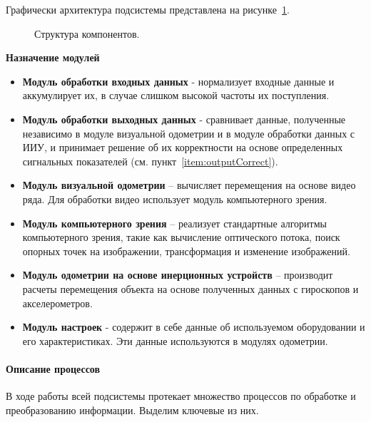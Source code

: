 Графически архитектура подсистемы представлена на рисунке~\ref{pic:acrhitec}.

\begin{figure}[!htb]
\caption{Структура компонентов.}
\label{pic:acrhitec}
\end{figure}

\textbf{Назначение модулей}

\begin{itemize}
\item \textbf{Модуль обработки входных данных} - нормализует входные данные и аккумулирует их, в случае слишком высокой частоты их поступления.
\item \textbf{Модуль обработки выходных данных} - сравнивает данные, полученные независимо в модуле визуальной одометрии и в модуле обработки данных с ИИУ, и принимает решение об их корректности на основе определенных сигнальных показателей (см. пункт~\ref{item:outputCorrect}).
\item \textbf{Модуль визуальной одометрии} – вычисляет перемещения на основе видео ряда. Для обработки видео использует модуль компьютерного зрения. 
\item \textbf{Модуль компьютерного зрения} – реализует стандартные алгоритмы компьютерного зрения, такие как вычисление оптического потока, поиск опорных точек на изображении, трансформация и изменение изображений.
\item \textbf{Модуль одометрии на основе инерционных устройств} – производит расчеты перемещения объекта на основе полученных данных с гироскопов и акселерометров.
\item \textbf{Модуль настроек} - содержит в себе данные об используемом оборудовании и его характеристиках. Эти данные используются в модулях одометрии. 
\end{itemize}

\paragraph{Описание процессов}
В ходе работы всей подсистемы протекает множество процессов по обработке и преобразованию информации. Выделим ключевые из них.

